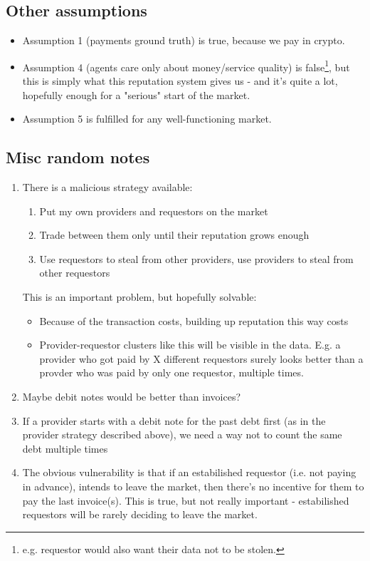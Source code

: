 \documentclass{article}
\begin{document}
\subsection{Other assumptions}

\begin{itemize}

    \item Assumption 1 (payments ground truth) is true, because we pay in crypto.
    \item Assumption 4 (agents care only about money/service quality) is false\footnote{e.g. requestor would also want their data not to be stolen.}, but this is simply what this reputation system gives us - and it's quite a lot,
hopefully enough for a "serious" start of the market.
    \item Assumption 5 is fulfilled for any well-functioning market.
\end{itemize}

\subsection{Misc random notes}
\begin{enumerate}
    \item There is a malicious strategy available:
        \begin{enumerate}
            \item Put my own providers and requestors on the market
            \item Trade between them only until their reputation grows enough
            \item Use requestors to steal from other providers, use providers to steal from other requestors
        \end{enumerate}
        This is an important problem, but hopefully solvable:
        \begin{itemize}
            \item Because of the transaction costs, building up reputation this way costs
            \item Provider-requestor clusters like this will be visible in the data. E.g. a provider who got paid by X different requestors surely looks better than
                a provder who was paid by only one requestor, multiple times.
        \end{itemize}
    \item Maybe debit notes would be better than invoices?
    \item If a provider starts with a debit note for the past debt first (as in the provider strategy described above), we need a way not to count the
        same debt multiple times
    \item The obvious vulnerability is that if an estabilished requestor (i.e. not paying in advance), intends to leave the market, then there's no
        incentive for them to pay the last invoice(s). This is true, but not really important - estabilished requestors will be rarely deciding to leave the market.
\end{enumerate}
\end{document}
